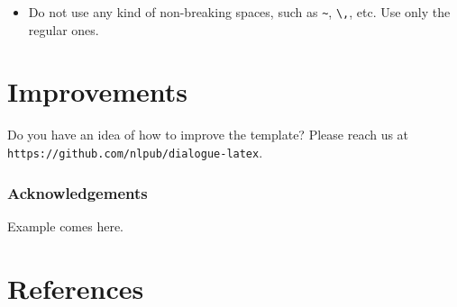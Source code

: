 \documentclass{dialogue}
\begin{document}
\begin{itemize}
  \item Do not use any kind of non-breaking spaces, such as \verb|~|, \verb|\,|, etc. Use only the regular ones.
\end{itemize}

\section{Improvements}

Do you have an idea of how to improve the template? Please reach us at\\\texttt{https://github.com/nlpub/dialogue-latex}.

\subsubsection*{Acknowledgements}

Example comes here.

\color{blue}\section*{References}

\makeatletter
\renewcommand{\section}{\@gobbletwo}
\makeatother

\end{document}
